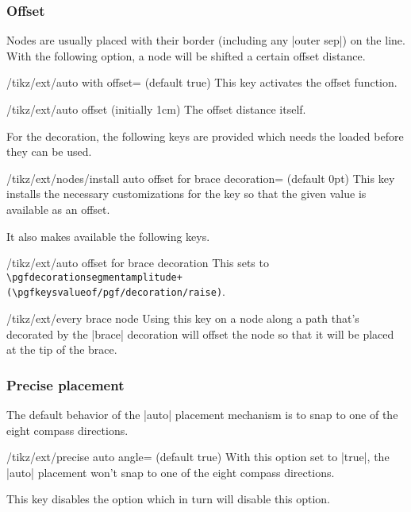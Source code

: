 \begin{multicols}{2}
\subsubsection{Offset}
Nodes are usually placed with their border (including any |outer sep|)
on the line.
With the following option, a node will be shifted a certain offset distance.

\begin{key}{/tikz/ext/auto with offset= (default true)}
  This key activates the offset function.
\end{key}
\begin{key}{/tikz/ext/auto offset (initially 1cm)}
The offset distance itself.
\end{key}

For the  decoration,
the following keys are provided which needs the
 loaded before they
can be used.
\begin{key}{/tikz/ext/nodes/install auto offset for brace decoration= (default 0pt)}
This key installs the necessary customizations
for the  key
so that the given value is available as an offset.

It also makes available the following keys.
\begin{stylekey}{/tikz/ext/auto offset for brace decoration}
This sets  to
\texttt{\textbackslash pgfdecorationsegmentamplitude+
  (\textbackslash pgfkeysvalueof{/pgf/decoration/raise})}.
\end{stylekey}
\begin{stylekey}{/tikz/ext/every brace node}
Using this key on a node along a path that's decorated by the |brace| decoration
will offset the node so that it will be placed at the tip of the brace.
\end{stylekey}
\end{key}

\subsubsection{Precise placement}
The default behavior of the |auto| placement mechanism is
to snap to one of the eight compass directions.
\begin{key}{/tikz/ext/precise auto angle= (default true)}
With this option set to |true|, the |auto| placement won't snap
to one of the eight compass directions.

This key disables the  option
which in turn will disable this option.
\end{key}
\end{multicols}